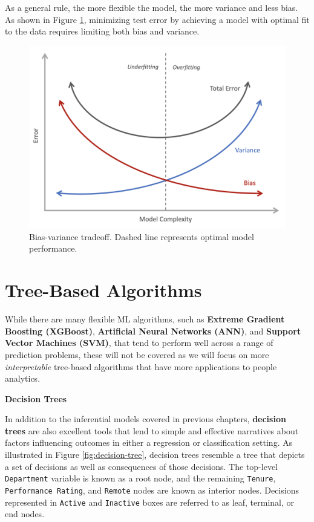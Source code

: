 \documentclass[
]{book}
\begin{document}
As a general rule, the more flexible the model, the more variance and less bias. As shown in Figure \ref{fig:bias-var-tradeoff}, minimizing test error by achieving a model with optimal fit to the data requires limiting both bias and variance.

\begin{figure}

{\centering \includegraphics[width=0.75\linewidth]{graphics/bias_variance_tradeoff} 

}

\caption{Bias-variance tradeoff. Dashed line represents optimal model performance.}\label{fig:bias-var-tradeoff}
\end{figure}

\hypertarget{tree-based-algorithms}{%
\section{Tree-Based Algorithms}\label{tree-based-algorithms}}

While there are many flexible ML algorithms, such as \textbf{Extreme Gradient Boosting (XGBoost)}, \textbf{Artificial Neural Networks (ANN)}, and \textbf{Support Vector Machines (SVM)}, that tend to perform well across a range of prediction problems, these will not be covered as we will focus on more \emph{interpretable} tree-based algorithms that have more applications to people analytics.

\textbf{Decision Trees}

In addition to the inferential models covered in previous chapters, \textbf{decision trees} are also excellent tools that lend to simple and effective narratives about factors influencing outcomes in either a regression or classification setting. As illustrated in Figure \ref{fig:decision-tree}, decision trees resemble a tree that depicts a set of decisions as well as consequences of those decisions. The top-level \texttt{Department} variable is known as a root node, and the remaining \texttt{Tenure}, \texttt{Performance\ Rating}, and \texttt{Remote} nodes are known as interior nodes. Decisions represented in \texttt{Active} and \texttt{Inactive} boxes are referred to as leaf, terminal, or end nodes.
\end{document}
